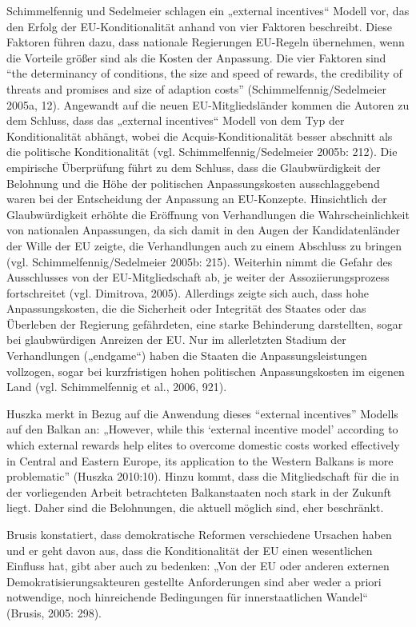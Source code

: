 Schimmelfennig und Sedelmeier schlagen ein „external incentives“ Modell vor, das den Erfolg der EU-Konditionalität anhand von vier Faktoren beschreibt. Diese Faktoren führen dazu, dass nationale Regierungen EU-Regeln übernehmen, wenn die Vorteile größer sind als die Kosten der Anpassung. Die vier Faktoren sind “the determinancy of conditions, the size and speed of rewards, the credibility of threats and promises and size of adaption costs” (Schimmelfennig/Sedelmeier 2005a, 12). Angewandt auf die neuen EU-Mitgliedsländer kommen die Autoren zu dem Schluss, dass das „external incentives“ Modell von dem Typ der Konditionalität abhängt, wobei die Acquis-Konditionalität besser abschnitt als die politische Konditionalität (vgl. Schimmelfennig/Sedelmeier 2005b: 212). Die empirische Überprüfung führt zu dem Schluss, dass die Glaubwürdigkeit der Belohnung und die Höhe der politischen Anpassungskosten ausschlaggebend waren bei der Entscheidung der Anpassung an EU-Konzepte. Hinsichtlich der Glaubwürdigkeit erhöhte die Eröffnung von Verhandlungen die Wahrscheinlichkeit von nationalen Anpassungen, da sich damit in den Augen der Kandidatenländer der Wille der EU zeigte, die Verhandlungen auch zu einem Abschluss zu bringen (vgl. Schimmelfennig/Sedelmeier 2005b: 215). Weiterhin nimmt die Gefahr des Ausschlusses von der EU-Mitgliedschaft ab, je weiter der Assoziierungsprozess fortschreitet (vgl. Dimitrova, 2005). Allerdings zeigte sich auch, dass hohe Anpassungskosten, die die Sicherheit oder Integrität des Staates oder das Überleben der Regierung gefährdeten, eine starke Behinderung darstellten, sogar bei glaubwürdigen Anreizen der EU. Nur im allerletzten Stadium der Verhandlungen („endgame“) haben die Staaten die Anpassungsleistungen vollzogen, sogar bei kurzfristigen hohen politischen Anpassungskosten im eigenen Land (vgl. Schimmelfennig et al., 2006, 921).\par

Huszka merkt in Bezug auf die Anwendung dieses “external incentives” Modells auf den Balkan an: „However, while this ‘external incentive model’ according to which external rewards help elites to overcome domestic costs worked effectively in Central and Eastern Europe, its application to the Western Balkans is more problematic” (Huszka 2010:10). Hinzu kommt, dass die Mitgliedschaft für die in der vorliegenden Arbeit betrachteten Balkanstaaten noch stark in der Zukunft liegt. Daher sind die Belohnungen, die aktuell möglich sind, eher beschränkt.\par

Brusis konstatiert, dass demokratische Reformen verschiedene Ursachen haben und er geht davon aus, dass die Konditionalität der EU einen wesentlichen Einfluss hat, gibt aber auch zu bedenken: „Von der EU oder anderen externen Demokratisierungsakteuren gestellte Anforderungen sind aber weder a priori notwendige, noch hinreichende Bedingungen für innerstaatlichen Wandel“ (Brusis, 2005: 298).

